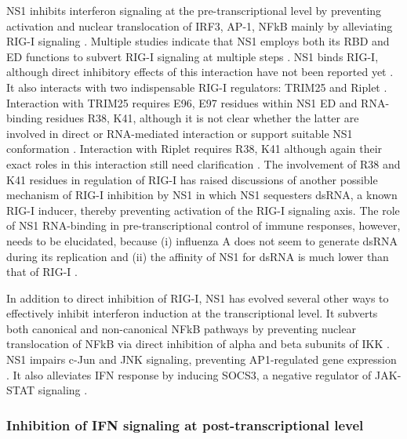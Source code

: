 		
		\gls{NS1} inhibits interferon signaling at the pre-transcriptional level by preventing activation and nuclear translocation of IRF3, AP-1, NFkB mainly by alleviating \gls{RIG-I} signaling \parencite{Talon2000, Ludwig2002, Wang2000, Geiss2002, Munir2012}. Multiple studies indicate that NS1 employs both its \gls{RBD} and \gls{ED} functions to subvert \gls{RIG-I} signaling at multiple steps \parencite{Haye2009, Ludwig2002, Tisoncik2011, Wang2000}. NS1 binds \gls{RIG-I}, although direct inhibitory effects of this interaction have not been reported yet \parencite{Opitz2007, Mibayashi2007a}. It also interacts with two indispensable \gls{RIG-I} regulators: TRIM25 and Riplet \parencite{Gack2009, Rajsbaum2012}. Interaction with TRIM25 requires E96, E97 residues within NS1 ED and RNA-binding residues R38, K41, although it is not clear whether the latter are involved in direct or RNA-mediated interaction or support suitable NS1 conformation \parencite{Gack2009}. Interaction with Riplet requires R38, K41 although again their exact roles in this interaction still need clarification \parencite{Rajsbaum2012}. The involvement of R38 and K41 residues in regulation of RIG-I has raised discussions of another possible mechanism of RIG-I inhibition by NS1 in which NS1 sequesters dsRNA, a known RIG-I inducer, thereby preventing activation of the RIG-I signaling axis. The role of NS1 RNA-binding in pre-transcriptional control   of immune responses, however, needs to be elucidated, because (i) influenza A does not seem to generate dsRNA during its replication \parencite{Wisskirchen2011} and (ii) the affinity of NS1 for dsRNA is much lower than that of RIG-I \parencite{Chien2004, Yin2007, Vela2012}.
		
		In addition to direct inhibition of RIG-I, NS1 has evolved several other ways to  effectively inhibit interferon induction at the transcriptional level. It subverts both canonical and non-canonical \gls{NFkB} pathways \parencite{Ruckle2012} by preventing nuclear translocation of \gls{NFkB} via direct inhibition of alpha and beta subunits of \gls{IKK} \parencite{Gao2012}. \gls{NS1} impairs c-Jun and JNK signaling, preventing \gls{AP1}-regulated gene expression \parencite{Ludwig2002}. It also alleviates IFN response by inducing \gls{SOCS3}, a negative regulator of \gls{JAK}-STAT signaling \parencite{Pauli2008}. 
		
		\subsubsection{Inhibition of IFN signaling at post-transcriptional level}
		
